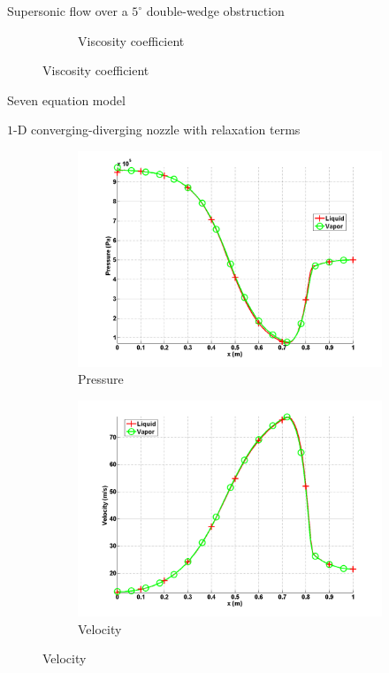 \documentclass[xcolor=dvipsnames,10pt]{beamer}
\begin{document}
\begin{frame}{Supersonic flow over a $5^\circ$ double-wedge obstruction}
\begin{figure}
\begin{subfigure}[b]{0.45\textwidth}
                \caption{Viscosity coefficient}
        \end{subfigure}
\end{figure}
\end{frame}
\begin{frame}
\begin{center}
Seven equation model
\end{center}
\end{frame}
\begin{frame}{$1$-D converging-diverging nozzle with relaxation terms}
\begin{figure}[H]
\begin{subfigure}[b]{0.38\textwidth}
\centering
\includegraphics[width=\textwidth]{../figures/SEM/Aint1e4_two_phases_pressure.png}
\caption{Pressure}
\end{subfigure}
%
\begin{subfigure}[b]{0.38\textwidth}
\centering
\includegraphics[width=\textwidth]{../figures/SEM/Aint1e4_two_phases_velocity.png}
\caption{Velocity}
\end{subfigure}


\end{figure}
\end{frame}
\end{document}
